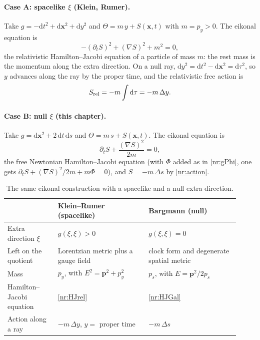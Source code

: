\paragraph{Case A: spacelike $\xi$ (Klein, Rumer).}
Take $g=-\mathrm{d}t^2+\mathrm{d}\mathbf{x}^2+\mathrm{d}y^2$ and
$\Theta=m\,y+S(\mathbf{x},t)$ with $m=p_y>0$. The eikonal equation is
\begin{equation}
  -(\partial_tS)^2+(\nabla S)^2+m^2=0 ,
  \label{nr:HJrel}
\end{equation}
the relativistic Hamilton--Jacobi equation of a particle of mass $m$: the rest
mass is the momentum along the extra direction. On a null ray,
$\mathrm{d}y^2=\mathrm{d}t^2-\mathrm{d}\mathbf{x}^2=\mathrm{d}\tau^2$, so $y$
advances along the ray by the proper time, and the relativistic free action is
\begin{equation}
  S_{\rm rel}=-m\int\mathrm{d}\tau=-m\,\Delta y .
  \label{nr:Srel}
\end{equation}

\paragraph{Case B: null $\xi$ (this chapter).}
Take $g=\mathrm{d}\mathbf{x}^2+2\,\mathrm{d}t\,\mathrm{d}s$ and
$\Theta=m\,s+S(\mathbf{x},t)$. The eikonal equation is
\begin{equation}
  \partial_tS+\frac{(\nabla S)^2}{2m}=0 ,
  \label{nr:HJGal}
\end{equation}
the free Newtonian Hamilton--Jacobi equation (with $\Phi$ added as in
\eqref{nr:gPhi}, one gets $\partial_tS+(\nabla S)^2/2m+m\Phi=0$), and
$S=-m\,\Delta s$ by \eqref{nr:action}.

\begin{table}[ht]
\centering
\footnotesize
\setlength{\tabcolsep}{4pt}
\renewcommand{\arraystretch}{1.25}
\begin{tabular}{@{}p{0.20\linewidth}p{0.36\linewidth}p{0.36\linewidth}@{}}
\toprule
 & \textbf{Klein--Rumer (spacelike)} & \textbf{Bargmann (null)}\\
\midrule
Extra direction $\xi$ & $g(\xi,\xi)>0$ & $g(\xi,\xi)=0$\\
Left on the quotient & Lorentzian metric plus a gauge field & clock form and degenerate spatial metric\\
Mass & $p_y$, with $E^2=\mathbf{p}^2+p_y^2$ & $p_s$, with $E=\mathbf{p}^2/2p_s$\\
Hamilton--Jacobi equation & \eqref{nr:HJrel} & \eqref{nr:HJGal}\\
Action along a ray & $-m\,\Delta y$, $y=$ proper time & $-m\,\Delta s$\\
\bottomrule
\end{tabular}
\caption{The same eikonal construction with a spacelike and a null extra direction.}
\label{tab:nr-rumer}
\end{table}


